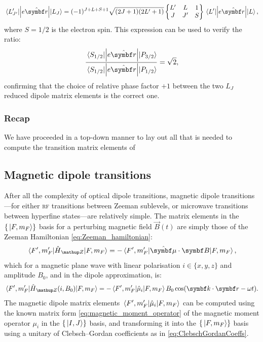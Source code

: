 \begin{align}
\matrixel{L^\prime_{J^\prime}}{\left|e\hat{\vec r}\right|}{L_J} = 
(-1)^{J+L+S+1}\sqrt{(2J+1)(2L^\prime+1)}
\left\{\begin{matrix}
L^\prime & L & 1\\
J & J^\prime & S
\end{matrix}\right\}
\matrixel{L^\prime}{\left|e\hat{\vec r}\right|}{L},
\end{align}
where $S=1/2$ is the electron spin. This expression can be used to verify the ratio:
\begin{align}
\frac
{\matrixel{S_{1/2}}{\left|e\hat{\vec r}\right|}{P_{3/2}}}
{\matrixel{S_{1/2}}{\left|e\hat{\vec r}\right|}{P_{1/2}}} = \sqrt{2},
\end{align}
confirming that the choice of relative phase factor $+1$ between the two $L_J$ reduced dipole matrix elements is the correct one.

\subsubsection{Recap}
We have proceeded in a top-down manner to lay out all that is needed to compute the transition matrix elements of 

\subsection{Magnetic dipole transitions}
After all the complexity of optical dipole transitions, magnetic dipole transitions---for either \textsc{rf} transitions between Zeeman sublevels, or microwave transitions between hyperfine states---are relatively simple. The matrix elements in the $\{\ket{F, m_F}\}$ basis for a perturbing magnetic field $\vec B(t)$ are simply those of the Zeeman Hamiltonian \eqref{eq:Zeeman_hamiltonian}:
\begin{align}
\matrixel{F^\prime, m_F^\prime}{\hat H_\up{Z}}{F, m_F}
=
-\matrixel{F^\prime, m_F^\prime}{\hat{\vec\mu}\cdot {\vec B}}{F, m_F},
\end{align} 
which for a magnetic plane wave with linear polarisation $i\in \{x, y, z\}$ and amplitude $B_0$, and in the dipole approximation, is:
\begin{align}
\matrixel{F^\prime, m_F^\prime}{\hat H_\up{Z}(i, B_0)}{F, m_F}
=
-\matrixel{F^\prime, m_F^\prime}{\hat{\mu}_i}{F, m_F}B_0 \cos(\vec k\cdot \vec r - \omega t).
\end{align}
The magnetic dipole matrix elements $\matrixel{F^\prime, m_F^\prime}{\hat{\mu}_i}{F, m_F}$ can be computed using the known matrix form \eqref{eq:magnetic_moment_operator} of the magnetic moment operator $\mu_i$ in the $\{\ket{I, J}\}$ basis, and transforming it into the $\{\ket{F, m_F}\}$ basis using a unitary of Clebsch--Gordan coefficients as in \eqref{eq:ClebschGordanCoeffs}.

